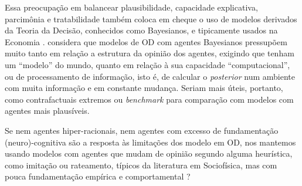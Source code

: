 Essa preocupação em balancear plausibilidade, capacidade explicativa, parcimônia
e tratabilidade também coloca em cheque o uso de modelos derivados da Teoria da
Decisão, conhecidos como Bayesianos, e tipicamente usados na Economia
\cite{acemoglu2011opinion}.  considera que
modelos de OD com agentes Bayesianos pressupõem  muito tanto em relação a
estrutura da opinião dos agentes, exigindo que tenham um ``modelo'' do mundo,
quanto em relação à sua capacidade ``computacional'', ou de processamento de
informação, isto é, de calcular o \textit{posterior} num ambiente com muita
informação e em constante mudança. Seriam mais úteis, portanto, como
contrafactuais extremos ou \textit{benchmark} para comparação com modelos com
agentes mais plausíveis.

Se nem agentes hiper-racionais, nem agentes com excesso de fundamentação
(neuro)-cognitiva são a resposta às limitações dos modelo em OD, nos mantemos
usando modelos  com agentes que mudam de opinião segundo alguma
heurística, como imitação ou rateamento, típicos da literatura em Sociofísica,
mas com pouca fundamentação empírica e comportamental
\cite{acemoglu2011opinion}?

